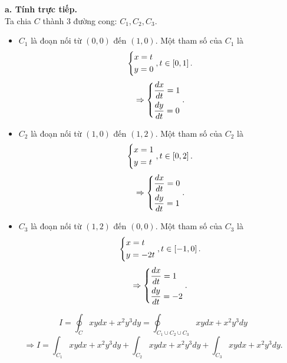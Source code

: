 \documentclass[12pt,a4paper]{article}
\begin{document}
\textbf{a. Tính trực tiếp.}\\
Ta chia \(C\) thành \(3\) đường cong: \(C_1, C_2, C_3.\)
\begin{itemize}
	\item \(C_1\) là đoạn nối từ \(\left( {0,0} \right)\) đến \(\left( {1,0} \right).\) Một tham số của \(C_1\) là
\[\left\{ \begin{gathered}
  x = t \hfill \\
  y = 0 \hfill \\ 
\end{gathered}  \right.,t \in \left[ {0,1} \right].\]
\[ \Rightarrow \left\{ \begin{gathered}
  \frac{{dx}}{{dt}} = 1 \hfill \\
  \frac{{dy}}{{dt}} = 0 \hfill \\ 
\end{gathered}  \right..\]
\item \(C_2\) là đoạn nối từ \(\left( {1,0} \right)\) đến \(\left( {1,2} \right).\) Một tham số của \(C_2\) là
\[\left\{ \begin{gathered}
  x = 1 \hfill \\
  y = t \hfill \\ 
\end{gathered}  \right.,t \in \left[ {0,2} \right].\]
\[ \Rightarrow \left\{ \begin{gathered}
  \frac{{dx}}{{dt}} = 0 \hfill \\
  \frac{{dy}}{{dt}} = 1 \hfill \\ 
\end{gathered}  \right..\]
\item \(C_3\) là đoạn nối từ \(\left( {1,2} \right)\) đến \(\left( {0,0} \right).\) Một tham số của \(C_3\) là
\[\left\{ \begin{gathered}
  x = t \hfill \\
  y =  - 2t \hfill \\ 
\end{gathered}  \right.,t \in \left[ { - 1,0} \right].\]
\[ \Rightarrow \left\{ \begin{gathered}
  \frac{{dx}}{{dt}} = 1 \hfill \\
  \frac{{dy}}{{dt}} =  - 2 \hfill \\ 
\end{gathered}  \right..\]
\end{itemize}
\[I = \oint_C {xydx + {x^2}{y^3}dy}  = \oint_{{C_1} \cup {C_2} \cup {C_3}} {xydx + {x^2}{y^3}dy} \]
\[ \Rightarrow I = \int_{{C_1}} {xydx + {x^2}{y^3}dy}  + \int_{{C_2}} {xydx + {x^2}{y^3}dy}  + \int_{{C_3}} {xydx + {x^2}{y^3}dy} .\]
\end{document}
